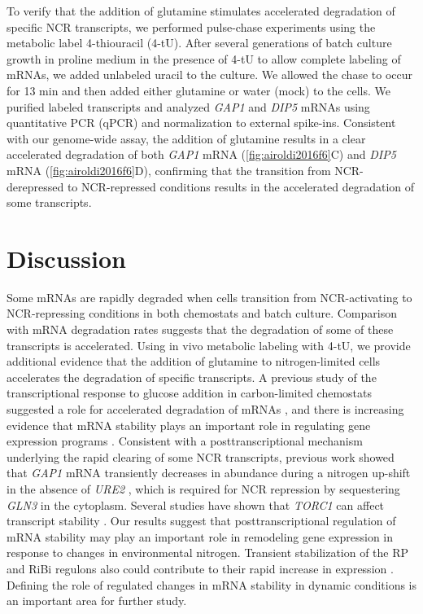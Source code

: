 To verify
that the addition of glutamine stimulates accelerated degradation of
specific NCR transcripts, we performed pulse-chase experiments using
the metabolic label 4-thiouracil (4-tU). After several generations of
batch culture growth in proline medium in the presence of 4-tU to
allow complete labeling of mRNAs, we added unlabeled uracil to the
culture. We allowed the chase to occur for 13 min and then added
either glutamine or water (mock) to the cells. We purified labeled
transcripts and analyzed \textit{GAP1} and \textit{DIP5} 
mRNAs using quantitative PCR
(qPCR) and normalization to external spike-ins. Consistent with our
genome-wide assay, the addition of glutamine results in a clear
accelerated degradation of both \textit{GAP1} mRNA 
(\autoref{fig:airoldi2016f6}C)
and \textit{DIP5} mRNA (\autoref{fig:airoldi2016f6}D), 
confirming that the transition from NCR-derepressed to
NCR-repressed conditions results in the accelerated degradation of
some transcripts.  

\section{Discussion} 

Some mRNAs are rapidly degraded when cells
transition from NCR-activating to NCR-repressing conditions in both
chemostats and batch culture. Comparison with mRNA degradation rates
suggests that the degradation of some of these transcripts is
accelerated. Using in vivo metabolic labeling with 4-tU, we provide
additional evidence that the addition of glutamine to nitrogen-limited
cells accelerates the degradation of specific transcripts. A previous
study of the transcriptional response to glucose addition in
carbon-limited chemostats suggested a role for accelerated degradation
of mRNAs 
\parencite{kresnowati2006transcriptome}
, and there is increasing evidence
that mRNA stability plays an important role in regulating gene
expression programs 
\parencite{puig2005coordinated,bennett2008metabolic,baumgartner2011antagonistic}. 
Consistent with a posttranscriptional
mechanism underlying the rapid clearing of some NCR transcripts,
previous work showed that \textit{GAP1} mRNA transiently decreases in abundance
during a nitrogen up-shift in the absence of \textit{URE2} 
\parencite{ter1998repression}, 
which is required for NCR repression by sequestering \textit{GLN3} in
the cytoplasm. Several studies have shown that \textit{TORC1} can affect
transcript stability 
\parencite{albig2001target,munchel2011dynamic}.
Our results suggest that posttranscriptional regulation of mRNA
stability may play an important role in remodeling gene expression in
response to changes in environmental nitrogen. Transient stabilization
of the RP and RiBi regulons also could contribute to their rapid
increase in expression 
\parencite{yin2003glucose}. Defining the role of
regulated changes in mRNA stability in dynamic conditions is an
important area for further study. 

